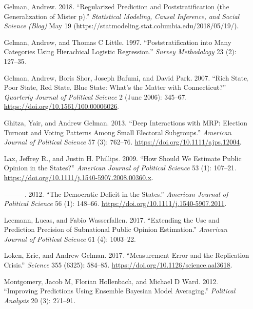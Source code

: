 \documentclass[
]{article}
\newlength{\cslhangindent}
\newlength{\cslentryspacingunit} %
\newenvironment{CSLReferences}[2] %
 {%
  \setlength{\parindent}{0pt}
  \ifodd #1
  \let\oldpar\par
  \def\par{\hangindent=\cslhangindent\oldpar}
  \fi
  \setlength{\parskip}{#2\cslentryspacingunit}
 }%
 {}
\begin{document}
\begin{CSLReferences}{1}{0}
\leavevmode{}%
Gelman, Andrew. 2018. {``Regularized Prediction and Poststratification
(the Generalization of Mister p).''} \emph{Statistical Modeling, Causal
Inference, and Social Science (Blog)} May 19
(https://statmodeling.stat.columbia.edu/2018/05/19/).

\leavevmode{}%
Gelman, Andrew, and Thomas C Little. 1997. {``Poststratification into
Many Categories Using Hierachical Logistic Regression.''} \emph{Survey
Methodology} 23 (2): 127--35.

\leavevmode{}%
Gelman, Andrew, Boris Shor, Joseph Bafumi, and David Park. 2007. {``Rich
State, Poor State, Red State, Blue State: What's the Matter with
Connecticut?''} \emph{Quarterly Journal of Political Science} 2 (June
2006): 345--67. \url{https://doi.org/10.1561/100.00006026}.

\leavevmode{}%
Ghitza, Yair, and Andrew Gelman. 2013. {``Deep Interactions with MRP:
Election Turnout and Voting Patterns Among Small Electoral Subgroups.''}
\emph{American Journal of Political Science} 57 (3): 762--76.
\url{https://doi.org/10.1111/ajps.12004}.

\leavevmode{}%
Lax, Jeffrey R., and Justin H. Phillips. 2009. {``How Should We Estimate
Public Opinion in the States?''} \emph{American Journal of Political
Science} 53 (1): 107--21.
\url{https://doi.org/10.1111/j.1540-5907.2008.00360.x}.

\leavevmode{}%
---------. 2012. {``The Democratic Deficit in the States.''}
\emph{American Journal of Political Science} 56 (1): 148--66.
\url{https://doi.org/10.1111/j.1540-5907.2011}.

\leavevmode{}%
Leemann, Lucas, and Fabio Wasserfallen. 2017. {``Extending the Use and
Prediction Precision of Subnational Public Opinion Estimation.''}
\emph{American Journal of Political Science} 61 (4): 1003--22.

\leavevmode{}%
Loken, Eric, and Andrew Gelman. 2017. {``Measurement Error and the
Replication Crisis.''} \emph{Science} 355 (6325): 584--85.
\url{https://doi.org/10.1126/science.aal3618}.

\leavevmode{}%
Montgomery, Jacob M, Florian Hollenbach, and Michael D Ward. 2012.
{``Improving Predictions Using Ensemble Bayesian Model Averaging.''}
\emph{Political Analysis} 20 (3): 271--91.


\end{CSLReferences}
\end{document}

